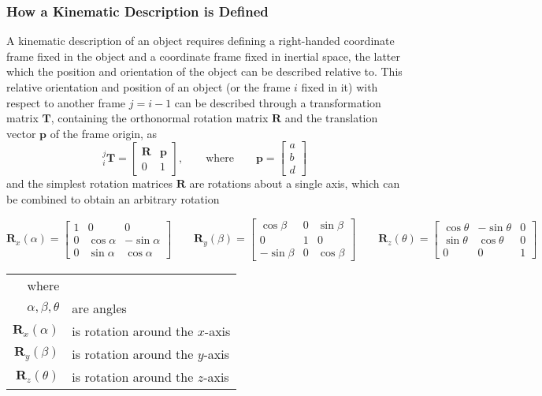 \subsubsection{How a Kinematic Description is Defined}
A kinematic description of an object requires defining a right-handed coordinate frame fixed in the object and a coordinate frame fixed in inertial space, the latter which the position and orientation of the object can be described relative to. This relative orientation and position of an object (or the frame $i$ fixed in it) with respect to another frame $j=i-1$ can be described through a transformation matrix $\textbf{T}$, containing the orthonormal rotation matrix $\mathbf{R}$ and the translation vector $\textbf{p}$ of the frame origin, as 
\begin{equation}
^j_i\textbf{T} = 
\begin{bmatrix}
\mathbf{R} & \mathbf{p}\\
0 & 1
\end{bmatrix}, \label{eq:kin_transformation}
\qquad \text{where} \qquad
\textbf{p} = 
\begin{bmatrix}
a\\b\\d
\end{bmatrix}
\end{equation}
and the simplest rotation matrices $\mathbf{R}$ are rotations about a single axis, which can be combined to obtain an arbitrary rotation
\begin{small}
	\begin{equation}
	\textbf{R}_x(\alpha) = 
	\begin{bmatrix}
	1 & 0 & 0\\
	0 & \cos\alpha & -\sin\alpha\\
	0 & \sin\alpha & \cos\alpha
	\end{bmatrix} 
	\qquad
	\textbf{R}_y(\beta) = 
	\begin{bmatrix}
	\cos\beta & 0 & \sin\beta \\
	0 & 1 & 0\\
	-\sin\beta & 0 & \cos\beta
	\end{bmatrix}
	\qquad
	\textbf{R}_z(\theta) = 
	\begin{bmatrix}
	\cos\theta & -\sin\theta & 0\\
	\sin\theta & \cos\theta & 0\\
	0 & 0 & 1
	\end{bmatrix}
	\label{eq:RxRyRz_chapter}
	\end{equation}
\end{small}
\begin{tabular}{rp{12.5cm}} 
where  &  \\
$\alpha, \beta, \theta$ & are angles \\
$\textbf{R}_x(\alpha)$ & is rotation around the $x$-axis  \\
$\textbf{R}_y(\beta)$ & is rotation around the $y$-axis  \\
$\textbf{R}_z(\theta)$ & is rotation around the $z$-axis  
\end{tabular}\\

